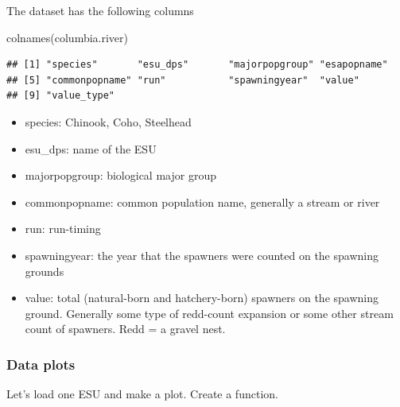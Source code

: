 \documentclass[
]{article}
\newenvironment{Shaded}{\begin{snugshade}}{\end{snugshade}}
\newcommand{\FunctionTok}[1]{\textcolor[rgb]{0.00,0.00,0.00}{#1}}
\newcommand{\NormalTok}[1]{#1}
\providecommand{\tightlist}{%
  \setlength{\itemsep}{0pt}\setlength{\parskip}{0pt}}
\begin{document}
The dataset has the following columns

\begin{Shaded}
\begin{Highlighting}[]
\FunctionTok{colnames}\NormalTok{(columbia.river)}
\end{Highlighting}
\end{Shaded}

\begin{verbatim}
## [1] "species"       "esu_dps"       "majorpopgroup" "esapopname"   
## [5] "commonpopname" "run"           "spawningyear"  "value"        
## [9] "value_type"
\end{verbatim}

\begin{itemize}
\tightlist
\item
  species: Chinook, Coho, Steelhead
\item
  esu\_dps: name of the ESU
\item
  majorpopgroup: biological major group
\item
  commonpopname: common population name, generally a stream or river
\item
  run: run-timing
\item
  spawningyear: the year that the spawners were counted on the spawning
  grounds
\item
  value: total (natural-born and hatchery-born) spawners on the spawning
  ground. Generally some type of redd-count expansion or some other
  stream count of spawners. Redd = a gravel nest.
\end{itemize}

\hypertarget{data-plots}{%
\subsubsection{Data plots}\label{data-plots}}

Let's load one ESU and make a plot. Create a function.
\end{document}
